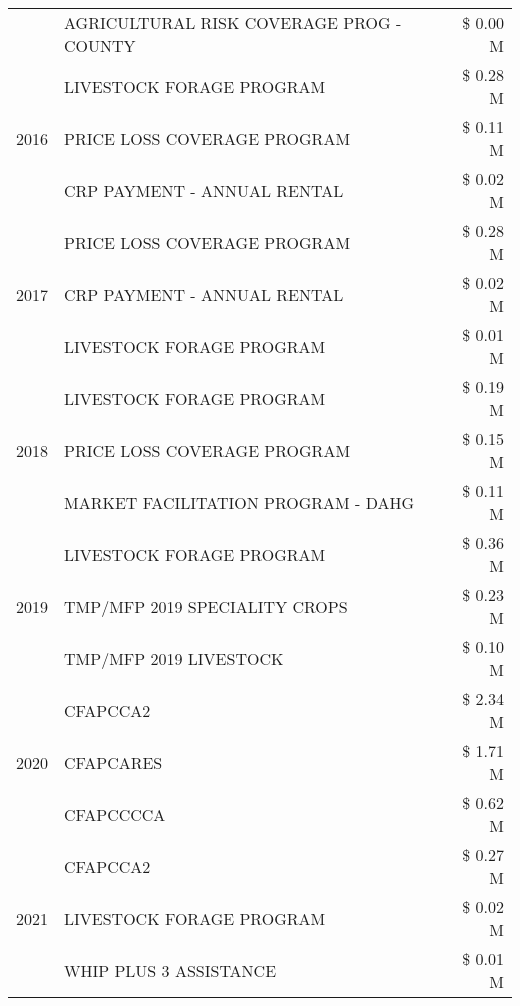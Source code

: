 \begin{tabular}{llr}
 & AGRICULTURAL RISK COVERAGE PROG - COUNTY & \$ 0.00 M \\
\cline{1-3}
\multirow[t]{3}{*}{2016} & LIVESTOCK FORAGE PROGRAM & \$ 0.28 M \\
 & PRICE LOSS COVERAGE PROGRAM & \$ 0.11 M \\
 & CRP PAYMENT - ANNUAL RENTAL & \$ 0.02 M \\
\cline{1-3}
\multirow[t]{3}{*}{2017} & PRICE LOSS COVERAGE PROGRAM & \$ 0.28 M \\
 & CRP PAYMENT - ANNUAL RENTAL & \$ 0.02 M \\
 & LIVESTOCK FORAGE PROGRAM & \$ 0.01 M \\
\cline{1-3}
\multirow[t]{3}{*}{2018} & LIVESTOCK FORAGE PROGRAM & \$ 0.19 M \\
 & PRICE LOSS COVERAGE PROGRAM & \$ 0.15 M \\
 & MARKET FACILITATION PROGRAM - DAHG & \$ 0.11 M \\
\cline{1-3}
\multirow[t]{3}{*}{2019} & LIVESTOCK FORAGE PROGRAM & \$ 0.36 M \\
 & TMP/MFP 2019 SPECIALITY CROPS & \$ 0.23 M \\
 & TMP/MFP 2019 LIVESTOCK & \$ 0.10 M \\
\cline{1-3}
\multirow[t]{3}{*}{2020} & CFAPCCA2 & \$ 2.34 M \\
 & CFAPCARES & \$ 1.71 M \\
 & CFAPCCCCA & \$ 0.62 M \\
\cline{1-3}
\multirow[t]{3}{*}{2021} & CFAPCCA2 & \$ 0.27 M \\
 & LIVESTOCK FORAGE PROGRAM & \$ 0.02 M \\
 & WHIP PLUS 3 ASSISTANCE & \$ 0.01 M \\
\cline{1-3}
\bottomrule
\end{tabular}
